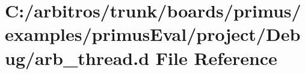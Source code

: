 \hypertarget{boards_2primus_2examples_2primus_eval_2project_2_debug_2arb__thread_8d}{\section{C\-:/arbitros/trunk/boards/primus/examples/primus\-Eval/project/\-Debug/arb\-\_\-thread.d File Reference}
\label{boards_2primus_2examples_2primus_eval_2project_2_debug_2arb__thread_8d}
}

